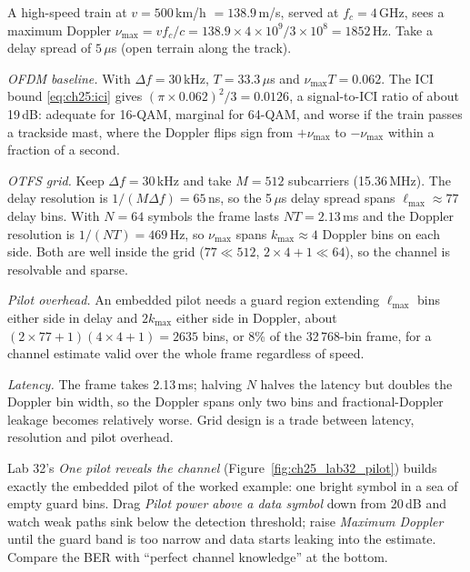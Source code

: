 \begin{worked}
A high-speed train at $v=500$\,km/h $=138.9$\,m/s, served at $f_c=4$\,GHz, sees a maximum Doppler
$\nu_{\max}=vf_c/c=138.9\times4\times10^9/3\times10^8=1852$\,Hz. Take a delay spread of $5\,\mu$s
(open terrain along the track).

\emph{OFDM baseline.} With $\Delta f=30$\,kHz, $T=33.3\,\mu$s and $\nu_{\max}T=0.062$. The ICI bound
\eqref{eq:ch25:ici} gives $(\pi\times0.062)^2/3=0.0126$, a signal-to-ICI ratio of about 19\,dB: adequate
for 16-QAM, marginal for 64-QAM, and worse if the train passes a trackside mast, where the Doppler
flips sign from $+\nu_{\max}$ to $-\nu_{\max}$ within a fraction of a second.

\emph{OTFS grid.} Keep $\Delta f=30$\,kHz and take $M=512$ subcarriers (15.36\,MHz). The delay
resolution is $1/(M\Delta f)=65$\,ns, so the 5\,$\mu$s delay spread spans $\ell_{\max}\approx77$ delay
bins. With $N=64$ symbols the frame lasts $NT=2.13$\,ms and the Doppler resolution is
$1/(NT)=469$\,Hz, so $\nu_{\max}$ spans $k_{\max}\approx4$ Doppler bins on each side. Both are well
inside the grid ($77\ll512$, $2\times4+1\ll64$), so the channel is resolvable and sparse.

\emph{Pilot overhead.} An embedded pilot needs a guard region extending $\ell_{\max}$ bins either side
in delay and $2k_{\max}$ either side in Doppler, about $(2\times77+1)(4\times4+1)=2635$ bins, or 8\% of the
32\,768-bin frame, for a channel estimate valid over the whole frame regardless of speed.

\emph{Latency.} The frame takes 2.13\,ms; halving $N$ halves the latency but doubles the Doppler bin
width, so the Doppler spans only two bins and fractional-Doppler leakage becomes relatively worse.
Grid design is a trade between latency, resolution and pilot overhead.
\end{worked}


\begin{tryit}
Lab 32's \emph{One pilot reveals the channel} (Figure~\ref{fig:ch25_lab32_pilot}) builds exactly the embedded pilot of the worked
example: one bright symbol in a sea of empty guard bins. Drag \emph{Pilot power above a data symbol}
down from 20\,dB and watch weak paths sink below the detection threshold; raise \emph{Maximum
Doppler} until the guard band is too narrow and data starts leaking into the estimate. Compare the
BER with ``perfect channel knowledge'' at the bottom.
\end{tryit}

